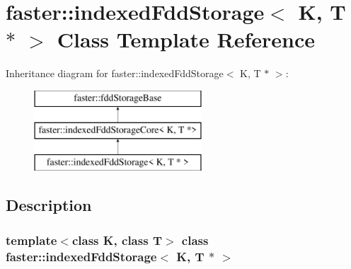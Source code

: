 \hypertarget{classfaster_1_1indexedFddStorage_3_01K_00_01T_01_5_01_4}{}\section{faster\+:\+:indexed\+Fdd\+Storage$<$ K, T $\ast$ $>$ Class Template Reference}
\label{classfaster_1_1indexedFddStorage_3_01K_00_01T_01_5_01_4}
Inheritance diagram for faster\+:\+:indexed\+Fdd\+Storage$<$ K, T $\ast$ $>$\+:\begin{figure}[H]
\begin{center}
\leavevmode
\includegraphics[height=3.000000cm]{classfaster_1_1indexedFddStorage_3_01K_00_01T_01_5_01_4}
\end{center}
\end{figure}


\subsection{Description}
\subsubsection*{template$<$class K, class T$>$\newline
class faster\+::indexed\+Fdd\+Storage$<$ K, T $\ast$ $>$}

